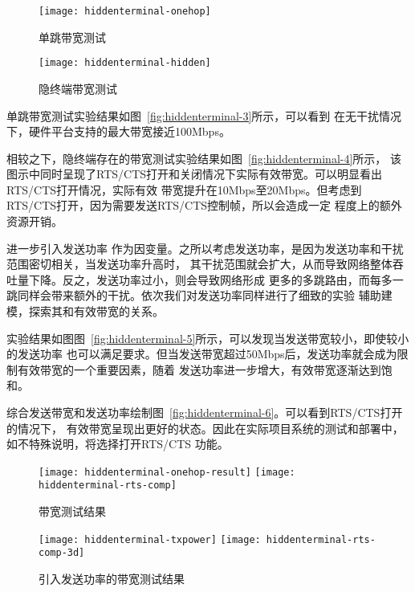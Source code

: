 \begin{figure}[H] %
  \centering
  \texttt{[image: hiddenterminal-onehop]}
  \caption{单跳带宽测试}
  \label{fig:hiddenterminal-1}
\end{figure}
\begin{figure}[H] %
  \centering
  \texttt{[image: hiddenterminal-hidden]}
  \caption{隐终端带宽测试}
  \label{fig:hiddenterminal-2}
\end{figure}

单跳带宽测试实验结果如图~\ref{fig:hiddenterminal-3}所示，可以看到
在无干扰情况下，硬件平台支持的最大带宽接近100Mbps。

相较之下，隐终端存在的带宽测试实验结果如图~\ref{fig:hiddenterminal-4}所示，
该图示中同时呈现了RTS/CTS打开和关闭情况下实际有效带宽。可以明显看出RTS/CTS打开情况，实际有效
带宽提升在10Mbps至20Mbps。但考虑到RTS/CTS打开，因为需要发送RTS/CTS控制帧，所以会造成一定
程度上的额外资源开销。

进一步引入发送功率
作为因变量。之所以考虑发送功率，是因为发送功率和干扰范围密切相关，当发送功率升高时，
其干扰范围就会扩大，从而导致网络整体吞吐量下降。反之，发送功率过小，则会导致网络形成
更多的多跳路由，而每多一跳同样会带来额外的干扰。依次我们对发送功率同样进行了细致的实验
辅助建模，探索其和有效带宽的关系。

实验结果如图图~\ref{fig:hiddenterminal-5}所示，可以发现当发送带宽较小，即使较小的发送功率
也可以满足要求。但当发送带宽超过50Mbps后，发送功率就会成为限制有效带宽的一个重要因素，随着
发送功率进一步增大，有效带宽逐渐达到饱和。

综合发送带宽和发送功率绘制图~\ref{fig:hiddenterminal-6}。可以看到RTS/CTS打开的情况下，
有效带宽呈现出更好的状态。因此在实际项目系统的测试和部署中，如不特殊说明，将选择打开RTS/CTS
功能。

\begin{figure}[h]
  \centering
      {\texttt{[image: hiddenterminal-onehop-result]}}
  \hspace{1em}
    {\texttt{[image: hiddenterminal-rts-comp]}}
  \caption{带宽测试结果}
\end{figure}

\begin{figure}[h]
  \centering
      {\texttt{[image: hiddenterminal-txpower]}}
  \hspace{1em}
    {\texttt{[image: hiddenterminal-rts-comp-3d]}}
  \caption{引入发送功率的带宽测试结果}
\end{figure}

